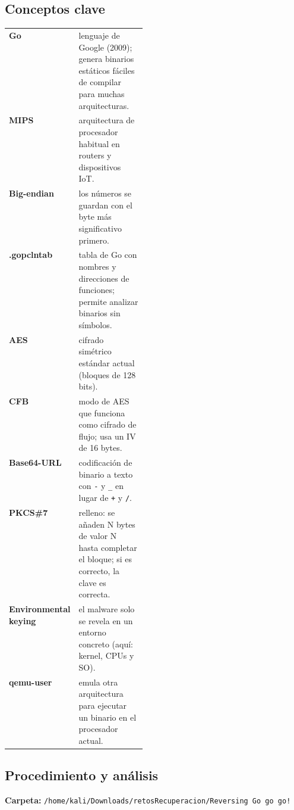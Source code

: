 \documentclass[11pt,a4paper]{article}
\begin{document}
\subsection{Conceptos clave}
\begin{tabularx}{\linewidth}{@{}>{\raggedright\arraybackslash}p{0.27\linewidth}X@{}}
\toprule
\textbf{Go} & lenguaje de Google (2009); genera binarios estáticos fáciles de compilar para muchas arquitecturas. \\ 
\textbf{MIPS} & arquitectura de procesador habitual en routers y dispositivos IoT. \\ 
\textbf{Big-endian} & los números se guardan con el byte más significativo primero. \\ 
\textbf{.gopclntab} & tabla de Go con nombres y direcciones de funciones; permite analizar binarios sin símbolos. \\ 
\textbf{AES} & cifrado simétrico estándar actual (bloques de 128 bits). \\ 
\textbf{CFB} & modo de AES que funciona como cifrado de flujo; usa un IV de 16 bytes. \\ 
\textbf{Base64-URL} & codificación de binario a texto con \texttt{-} y \texttt{\_} en lugar de \texttt{+} y \texttt{/}. \\ 
\textbf{PKCS\#7} & relleno: se añaden N bytes de valor N hasta completar el bloque; si es correcto, la clave es correcta. \\ 
\textbf{Environmental keying} & el malware solo se revela en un entorno concreto (aquí: kernel, CPUs y SO). \\ 
\textbf{qemu-user} & emula otra arquitectura para ejecutar un binario en el procesador actual. \\ 
\bottomrule
\end{tabularx}

\subsection{Procedimiento y análisis}

\noindent\textbf{Carpeta:} \texttt{/\allowbreak{}home/\allowbreak{}kali/\allowbreak{}Downloads/\allowbreak{}retosRecuperacion/\allowbreak{}Reversing Go go go!}
\end{document}

